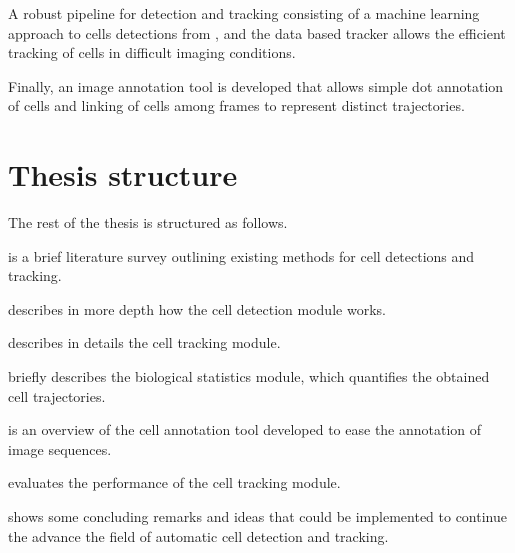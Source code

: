 		A robust pipeline for detection and tracking consisting of a machine learning approach to cells detections from \cite{arteta12}, and the data based tracker  allows the efficient tracking of cells in difficult imaging conditions.
		
		Finally, an image annotation tool is developed that allows simple dot annotation of cells and linking of cells among frames to represent distinct trajectories.
		
	\section{Thesis structure \statusfirstdraft}
		The rest of the thesis is structured as follows.
		
		 is a brief literature survey outlining existing methods for cell detections and tracking.
		
		 describes in more depth how the cell detection module works.
		
		 describes in details the cell tracking module.
		
		 briefly describes the biological statistics module, which quantifies the obtained cell trajectories. 
	
		 is an overview of the cell annotation tool developed to ease the annotation of image sequences.
		
		 evaluates the performance of the cell tracking module.
		
		 shows some concluding remarks and ideas that could be implemented to continue the advance the field of automatic cell detection and tracking.
